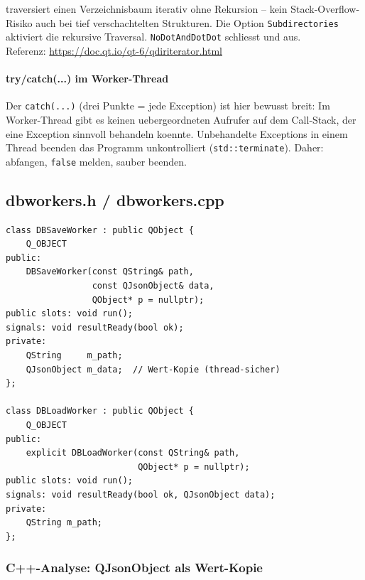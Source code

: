 \begin{qtinfo}[title={Qt-Hintergrund: QDirIterator}]
 traversiert einen Verzeichnisbaum
iterativ ohne Rekursion -- kein Stack-Overflow-Risiko auch
bei tief verschachtelten Strukturen.
Die Option \verb|Subdirectories| aktiviert die rekursive
Traversal. \verb|NoDotAndDotDot| schliesst  und
 aus.\\
Referenz: \url{https://doc.qt.io/qt-6/qdiriterator.html}
\end{qtinfo}

\paragraph{try/catch(...) im Worker-Thread}
Der \verb|catch(...)| (drei Punkte = jede Exception)
ist hier bewusst breit: Im Worker-Thread gibt es keinen
uebergeordneten Aufrufer auf dem Call-Stack, der eine
Exception sinnvoll behandeln koennte. Unbehandelte
Exceptions in einem Thread beenden das Programm unkontrolliert
(\verb|std::terminate|). Daher: abfangen, \verb|false|
melden, sauber beenden.

\subsection{dbworkers.h / dbworkers.cpp}

\begin{lstlisting}[style=header, caption={dbworkers.h}]
class DBSaveWorker : public QObject {
    Q_OBJECT
public:
    DBSaveWorker(const QString& path,
                 const QJsonObject& data,
                 QObject* p = nullptr);
public slots: void run();
signals: void resultReady(bool ok);
private:
    QString     m_path;
    QJsonObject m_data;  // Wert-Kopie (thread-sicher)
};

class DBLoadWorker : public QObject {
    Q_OBJECT
public:
    explicit DBLoadWorker(const QString& path,
                          QObject* p = nullptr);
public slots: void run();
signals: void resultReady(bool ok, QJsonObject data);
private:
    QString m_path;
};
\end{lstlisting}

\subsubsection{C++-Analyse: QJsonObject als Wert-Kopie}

